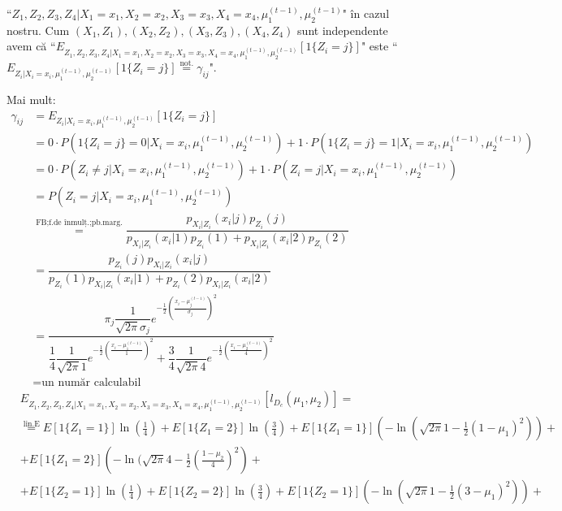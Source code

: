 \documentclass[12pt]{article}
\begin{document}
\begin{enumerate}
		\noindent``$Z_1,Z_2,Z_3,Z_4|X_1=x_1,X_2=x_2,X_3=x_3,X_4=x_4,\mu_1^{(t-1)},\mu_2^{(t-1)}$" în cazul nostru. Cum $(X_1,Z_1),(X_2,Z_2),(X_3,Z_3),(X_4,Z_4)$ sunt independente avem că ``$E_{Z_1,Z_2,Z_3,Z_4|X_1=x_1,X_2=x_2,X_3=x_3,X_4=x_4,\mu_1^{(t-1)},\mu_2^{(t-1)}}[1\{Z_i = j\}]$" este ``$E_{Z_i|X_i=x_i,\mu_1^{(t-1)},\mu_2^{(t-1)}}[1\{Z_i = j\}] \stackrel{\text{not.}}{=}\gamma_{ij}$".
		
		Mai mult:
		\begin{align*}
		\gamma_{ij} &= E_{Z_i|X_i=x_i,\mu_1^{(t-1)},\mu_2^{(t-1)}}[1\{Z_i=j\}]\\
		&=0 \cdot P(1\{Z_i=j\} = 0 | X_i = x_i, \mu_1^{(t-1)},\mu_2^{(t-1)}) + 1 \cdot P(1\{Z_i=j\} = 1 | X_i = x_i, \mu_1^{(t-1)},\mu_2^{(t-1)})\\
		&=0 \cdot P(Z_i \neq j | X_i = x_i, \mu_1^{(t-1)},\mu_2^{(t-1)}) + 1 \cdot P(Z_i = j | X_i = x_i, \mu_1^{(t-1)},\mu_2^{(t-1)})\\
		&=P(Z_i = j | X_i = x_i, \mu_1^{(t-1)},\mu_2^{(t-1)})\\
		&\stackrel{\text{FB;f.de înmulț.;pb.marg.}}{=} \dfrac{p_{X_i|Z_i}(x_i|j) p_{Z_i}(j)}{p_{X_i|Z_i}(x_i|1) p_{Z_i}(1) + p_{X_i|Z_i}(x_i|2) p_{Z_i}(2)}\\
		&= \dfrac{p_{Z_i}(j) p_{X_i|Z_i}(x_i|j) }{ p_{Z_i}(1) p_{X_i|Z_i}(x_i|1) + p_{Z_i}(2) p_{X_i|Z_i}(x_i|2) }\\
		&=\dfrac{\pi_j \dfrac{1}{\sqrt{2\pi}\sigma_j} e^{-\frac{1}{2} \left(\frac{x_i - \mu_j^{(t-1)}}{\sigma_j}\right)^2}}{
	\dfrac{1}{4} \dfrac{1}{\sqrt{2\pi}1} e^{-\frac{1}{2} \left(\frac{x_i - \mu_1^{(t-1)}}{1}\right)^2} + 
	\dfrac{3}{4} \dfrac{1}{\sqrt{2\pi}4} e^{-\frac{1}{2} \left(\frac{x_i - \mu_2^{(t-1)}}{4}\right)^2}	
	}\\
	&=\text{un număr calculabil}
	\end{align*}
		\begin{align*}
		&E_{Z_1,Z_2,Z_3,Z_4|X_1=x_1,X_2=x_2,X_3=x_3,X_4=x_4,\mu_1^{(t-1)},\mu_2^{(t-1)}}[l_{D_c}(\mu_1,\mu_2)] =\\
		&\stackrel{\text{lin.E}}{=} E[1\{Z_1 = 1\}] \ln\left(\frac{1}{4}\right) + E[1\{Z_1 = 2\}] \ln\left(\frac{3}{4}\right) + E[1\{Z_1 = 1\}] \left(-\ln(\sqrt{2\pi }1 - \frac{1}{2} (1 - \mu_1)^2)\right) + \\
		&+E[1\{Z_1 = 2\}] \left(-\ln(\sqrt{2\pi }4 - \frac{1}{2} \left(\frac{1 - \mu_2}{4}\right)^2\right) +\\
		&+E[1\{Z_2 = 1\}] \ln\left(\frac{1}{4}\right) + E[1\{Z_2 = 2\}] \ln\left(\frac{3}{4}\right) + E[1\{Z_2 = 1\}] \left(-\ln(\sqrt{2\pi }1 - \frac{1}{2} (3 - \mu_1)^2)\right) + \\

\end{align*}
\end{enumerate}
\end{document}
